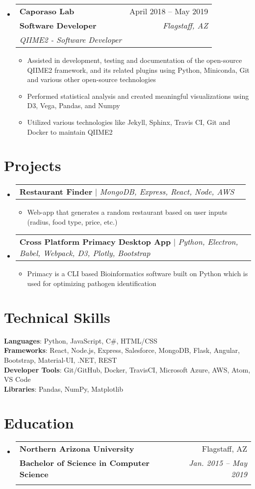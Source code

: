 \documentclass[letterpaper,11pt]{article}
\makeatletter
\newcommand{\resumeItem}[1]{
  \item\small{
    {#1 \vspace{-2pt}}
  }
}
\newcommand{\resumeSubheading}[5]{
  \vspace{-2pt}\item
    \begin{tabular*}{0.97\textwidth}[t]{l@{\extracolsep{\fill}}r}
      \textbf{#1} & #2 \\
      \textbf{\small#3} & \textit{\small #4} \\
      \textit{\small#5} \\
    \end{tabular*}\vspace{-7pt}
}
\newcommand{\resumeProjectHeading}[2]{
    \item
    \begin{tabular*}{0.97\textwidth}{l@{\extracolsep{\fill}}r}
      \small#1 & #2 \\
    \end{tabular*}\vspace{-7pt}
}
\newcommand{\resumeSubHeadingListStart}{\begin{itemize}[leftmargin=0.15in, label={}]}
\newcommand{\resumeSubHeadingListEnd}{\end{itemize}}
\newcommand{\resumeItemListStart}{\begin{itemize}}
\newcommand{\resumeItemListEnd}{\end{itemize}\vspace{-5pt}}
\makeatother
\begin{document}
\resumeSubHeadingListStart
\resumeSubheading
{Caporaso Lab}{April 2018 -- May 2019}
{Software Developer}{Flagstaff, AZ}
{QIIME2 - Software Developer}
\resumeItemListStart
\resumeItem{Assisted in development, testing and documentation of the open-source QIIME2 framework, and its related plugins using Python, Miniconda, Git and various other open-source technologies}
\resumeItem{Performed statistical analysis and created meaningful visualizations using D3, Vega, Pandas, and Numpy}
\resumeItem{Utilized various technologies like Jekyll, Sphinx, Travis CI, Git and Docker to maintain QIIME2}
\resumeItemListEnd
\resumeSubHeadingListEnd

\section{Projects}
\resumeSubHeadingListStart
\resumeProjectHeading
{\textbf{Restaurant Finder} $|$ \emph{MongoDB, Express, React, Node, AWS}}{}
\resumeItemListStart
\resumeItem{Web-app that generates a random restaurant based on user inputs (radius, food type, price, etc.)}
\resumeItemListEnd
\resumeProjectHeading
{\textbf{Cross Platform Primacy Desktop App} $|$ \emph{Python, Electron, Babel, Webpack, D3, Plotly, Bootstrap}}{}
\resumeItemListStart
\resumeItem{Primacy is a CLI based Bioinformatics software built on Python which is used for optimizing pathogen identification}
\resumeItemListEnd
\resumeSubHeadingListEnd


\section{Technical Skills}
\begin{itemize}[leftmargin=0.15in, label={}]
 \small{\item{
       \textbf{Languages}{: Python, JavaScript, C\#, HTML/CSS} \\
       \textbf{Frameworks}{: React, Node.js, Express, Salesforce, MongoDB, Flask, Angular, Bootstrap, Material-UI, .NET, REST} \\
       \textbf{Developer Tools}{: Git/GitHub, Docker, TravisCI, Microsoft Azure, AWS, Atom, VS Code} \\
       \textbf{Libraries}{: Pandas, NumPy, Matplotlib}
       }}
\end{itemize}

\section{Education}
\resumeSubHeadingListStart
\resumeSubheading
{Northern Arizona University}{Flagstaff, AZ}
{Bachelor of Science in Computer Science}{Jan. 2015 -- May 2019}
{}
\resumeSubHeadingListEnd

\end{document}
